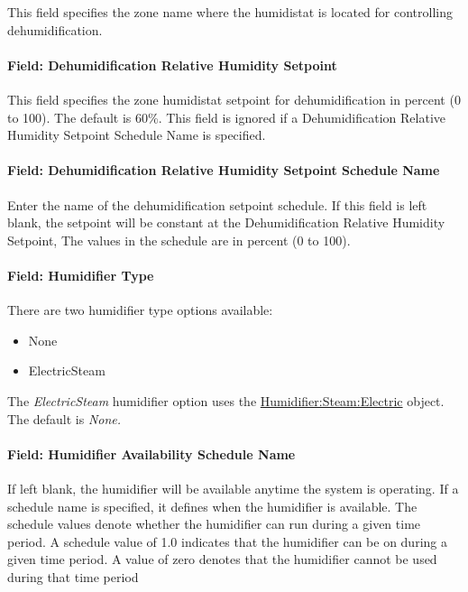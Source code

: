 This field specifies the zone name where the humidistat is located for controlling dehumidification.

\paragraph{Field: Dehumidification Relative Humidity Setpoint}\label{field-dehumidification-relative-humidity-setpoint-2}

This field specifies the zone humidistat setpoint for dehumidification in percent (0 to 100). The default is 60\%. This field is ignored if a Dehumidification Relative Humidity Setpoint Schedule Name is specified.

\paragraph{Field: Dehumidification Relative Humidity Setpoint Schedule Name}\label{field-dehumidification-relative-humidity-setpoint-schedule-name-2}

Enter the name of the dehumidification setpoint schedule. If this field is left blank, the setpoint will be constant at the Dehumidification Relative Humidity Setpoint, The values in the schedule are in percent (0 to 100).

\paragraph{Field: Humidifier Type}\label{field-humidifier-type-6}

There are two humidifier type options available:

\begin{itemize}
\item
  None
\item
  ElectricSteam
\end{itemize}

The \emph{ElectricSteam} humidifier option uses the \hyperref[humidifiersteamelectric]{Humidifier:Steam:Electric} object. The default is \emph{None.}

\paragraph{Field: Humidifier Availability Schedule Name}\label{field-humidifier-availability-schedule-name-6}

If left blank, the humidifier will be available anytime the system is operating. If a schedule name is specified, it defines when the humidifier is available. The schedule values denote whether the humidifier can run during a given time period. A schedule value of 1.0 indicates that the humidifier can be on during a given time period. A value of zero denotes that the humidifier cannot be used during that time period

